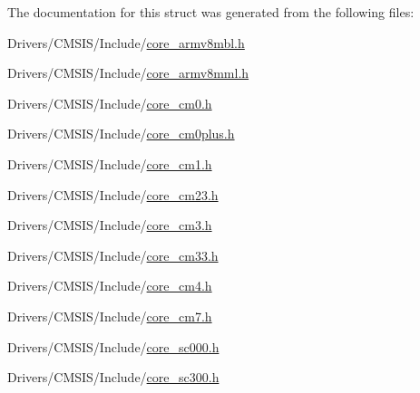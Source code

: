 The documentation for this struct was generated from the following files\+:\begin{DoxyCompactItemize}
\item 
Drivers/\+C\+M\+S\+I\+S/\+Include/\mbox{\hyperlink{core__armv8mbl_8h}{core\+\_\+armv8mbl.\+h}}\item 
Drivers/\+C\+M\+S\+I\+S/\+Include/\mbox{\hyperlink{core__armv8mml_8h}{core\+\_\+armv8mml.\+h}}\item 
Drivers/\+C\+M\+S\+I\+S/\+Include/\mbox{\hyperlink{core__cm0_8h}{core\+\_\+cm0.\+h}}\item 
Drivers/\+C\+M\+S\+I\+S/\+Include/\mbox{\hyperlink{core__cm0plus_8h}{core\+\_\+cm0plus.\+h}}\item 
Drivers/\+C\+M\+S\+I\+S/\+Include/\mbox{\hyperlink{core__cm1_8h}{core\+\_\+cm1.\+h}}\item 
Drivers/\+C\+M\+S\+I\+S/\+Include/\mbox{\hyperlink{core__cm23_8h}{core\+\_\+cm23.\+h}}\item 
Drivers/\+C\+M\+S\+I\+S/\+Include/\mbox{\hyperlink{core__cm3_8h}{core\+\_\+cm3.\+h}}\item 
Drivers/\+C\+M\+S\+I\+S/\+Include/\mbox{\hyperlink{core__cm33_8h}{core\+\_\+cm33.\+h}}\item 
Drivers/\+C\+M\+S\+I\+S/\+Include/\mbox{\hyperlink{core__cm4_8h}{core\+\_\+cm4.\+h}}\item 
Drivers/\+C\+M\+S\+I\+S/\+Include/\mbox{\hyperlink{core__cm7_8h}{core\+\_\+cm7.\+h}}\item 
Drivers/\+C\+M\+S\+I\+S/\+Include/\mbox{\hyperlink{core__sc000_8h}{core\+\_\+sc000.\+h}}\item 
Drivers/\+C\+M\+S\+I\+S/\+Include/\mbox{\hyperlink{core__sc300_8h}{core\+\_\+sc300.\+h}}\end{DoxyCompactItemize}

